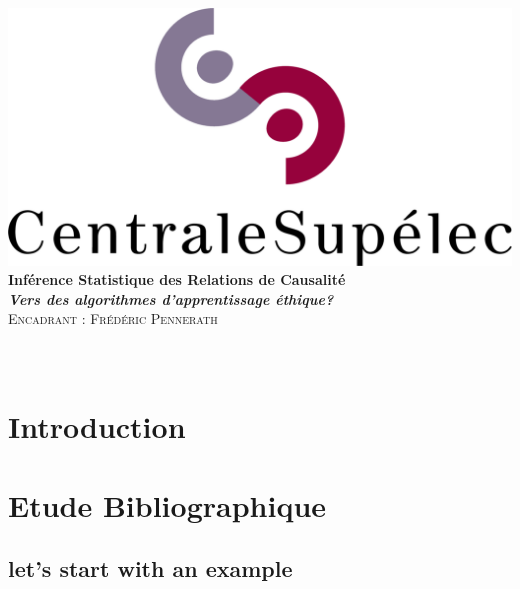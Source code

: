 \documentclass{article}
\author{\Large \textsc{Mohammed FELLAJI, Ahmed BEN AISSA}}
\date{September, 2020}
\begin{document}
\hypersetup{pdfborder=0 0 0} 		%


\makeatletter
  \begin{titlepage}
  \centering
     {\large \textsc{   }}\\
     \vspace{1em}
    \centering
      \includegraphics[width=0.5 \textwidth]{figures/LogoCS.png} \\
    \vspace{4cm}
      {\LARGE\textbf{Inférence Statistique des Relations de Causalité}\\
       \vspace{1em}
       {\large\textbf{
       \textit{\LARGE{Vers des algorithmes d'apprentissage éthique?}}}}\\
    \vspace{4cm}
    \centering
     {\Large \textsc{Encadrant : Frédéric Pennerath}}\\
     \vspace{1em}
        {\Large \@author} \\
        \vspace{3em}
        {\Large \@date} }\\
  \end{titlepage}
 
 
\makeatother

\tableofcontents




\newpage
\section{Introduction}


\newpage
\section{Etude Bibliographique}

\subsection{let's start with an example}
\end{document}
